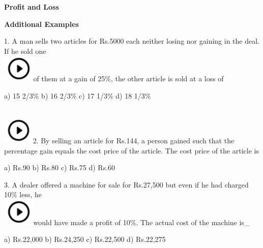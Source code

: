 \documentclass{article} %
\begin{document}
	




\noindent \textbf{Profit and Loss}

\noindent 

\noindent \textbf{Additional Examples}

\noindent 

\noindent 

1.   A man sells two articles for Rs.5000 each neither losing nor gaining in the deal. If he sold one  
\noindent \\ \includegraphics*[width=0.60in, height=0.52in]{images/image1}of them at a gain of 25\%, the other article is sold at a loss of

\noindent a) 15 2/3\%              b) 16 2/3\%       c) 17 1/3\%        d) 18 1/3\%

\noindent 

\noindent 

\noindent 

\noindent  
\noindent \\ \includegraphics*[width=0.59in, height=0.52in]{images/image1}2.   By selling an article for Rs.144, a person gained such that the percentage gain equals the cost price of the article. The cost price of the article is

\noindent a) Rs.90                   b) Rs.80                         c) Rs.75                          d) Rs.60

\noindent 

\noindent 

\noindent 

3.   A dealer offered a machine for sale for Rs.27,500 but even if he had charged 10\% less, he  
\noindent \\ \includegraphics*[width=0.60in, height=0.52in]{images/image1}would have made a profit of 10\%. The actual cost of the machine is\_

\noindent a) Rs.22,000                         b) Rs.24,250     c) Rs.22,500     d) Rs.22,275
\end{document}
